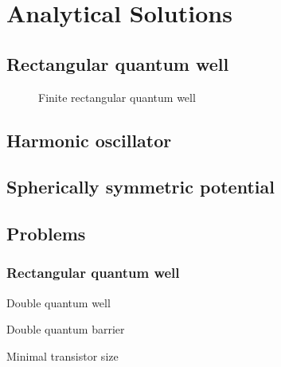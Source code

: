 \section{Analytical Solutions}
	\subsection{Rectangular quantum well}
		\begin{figure}
			\centering
			
			\caption{Finite rectangular quantum well}
		\end{figure}
		
	\subsection{Harmonic oscillator}
	\subsection{Spherically symmetric potential}
	\subsection{Problems}
		\subsubsection{Rectangular quantum well}
			Double quantum well
			
			Double quantum barrier
			
			Minimal transistor size
			
			